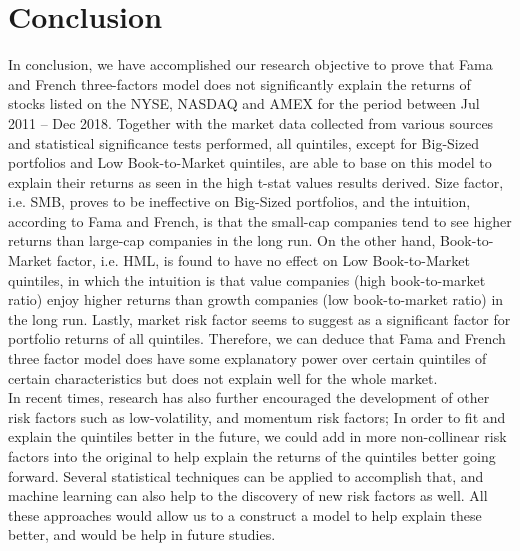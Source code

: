 \documentclass[12pt]{article}
\begin{document}
	\section{Conclusion} %
In conclusion, we have accomplished our research objective to prove that Fama and French three-factors model does not significantly explain the returns of stocks listed on the NYSE, NASDAQ and AMEX for the period between Jul 2011 – Dec 2018. Together with the market data collected from various sources and statistical significance tests performed, all quintiles, except for Big-Sized portfolios and Low Book-to-Market quintiles, are able to base on this model to explain their returns as seen in the high t-stat values results derived. Size factor, i.e. SMB, proves to be ineffective on Big-Sized portfolios, and the intuition, according to Fama and French, is that the small-cap companies tend to see higher returns than large-cap companies in the long run. On the other hand, Book-to-Market factor, i.e. HML, is found to have no effect on Low Book-to-Market quintiles, in which the intuition is that value companies (high book-to-market ratio) enjoy higher returns than growth companies (low book-to-market ratio) in the long run. Lastly, market risk factor seems to suggest as a significant factor for portfolio returns of all quintiles. Therefore, we can deduce that Fama and French three factor model does have some explanatory power over certain quintiles of certain characteristics but does not explain well for the whole market. \\


\noindent In recent times, research has also further encouraged the development of other risk factors such as low-volatility, and momentum risk factors; In order to fit and explain the quintiles better in the future, we could add in more non-collinear risk factors into the original to help explain the returns of the quintiles better going forward. Several statistical techniques can be applied to accomplish that, and machine learning can also help to the discovery of new risk factors as well. All these approaches would allow us to a construct a model to help explain these better, and would be help in future studies.\\
\end{document}
